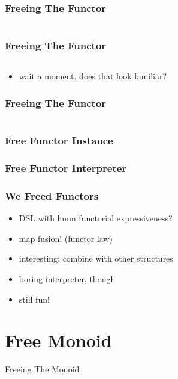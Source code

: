 \documentclass{beamer}
\begin{document}
\begin{frame}[fragile]
  \frametitle{Freeing The Functor}
  \inputminted[highlightlines={3-4}, highlightcolor=yellow!40]{scala}{snippets/free-functor2.scala}
\end{frame}

\begin{frame}[fragile]
  \frametitle{Freeing The Functor}
  \inputminted{scala}{snippets/free-functor3.scala}
  \begin{itemize}
  \item wait a moment, does that look familiar?
  \end{itemize}
\end{frame}

\begin{frame}[fragile]
  \frametitle{Freeing The Functor}
  \inputminted{scala}{snippets/free-functor4.scala}
\end{frame}

\begin{frame}[fragile]
  \frametitle{Free Functor Instance}
\end{frame}

\begin{frame}[fragile]
  \frametitle{Free Functor Interpreter}
\end{frame}

\begin{frame}
  \frametitle{We Freed Functors}
  \begin{itemize}
  \item DSL with hmm functorial expressiveness?
  \item map fusion! (functor law)
  \item interesting: combine with other structures
  \item boring interpreter, though
  \item still fun!
  \end{itemize}
\end{frame}

\section{Free Monoid}
\label{sec:free-monoid}

\begin{frame}
  \begin{center}
    \Huge
    Freeing The Monoid
  \end{center}
\end{frame}
\end{document}

